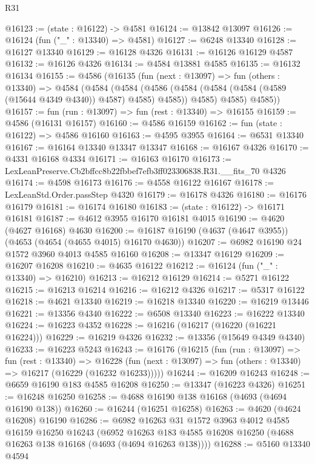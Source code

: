 \begin{lexlean}{R31}
\begin{coremodule}
@16123 := (state : @16122) -> @4581
@16124 := @13842 @13097
@16126 := @16124 (fun ("_" : @13340) => @4581)
@16127 := @6248 @13340
@16128 := @16127 @13340
@16129 := @16128 @4326
@16131 := @16126 @16129 @4587
@16132 := @16126 @4326
@16134 := @4584 @13881 @4585
@16135 := @16132 @16134
@16155 := @4586
    (@16135
      (fun (next : @13097) =>
      fun (others : @13340) =>
      @4584
        (@4584
          (@4584
            (@4586 (@4584 (@4584 (@4584 (@4589 (@15644 @4349 @4340)) @4587) @4585) @4585))
            @4585)
          @4585)
        @4585))
@16157 := fun (run : @13097) => fun (rest : @13340) => @16155
@16159 := @4586 (@16131 @16157)
@16160 := @4586 @16159
@16162 := fun (state : @16122) => @4586 @16160
@16163 := @4595 @3955
@16164 := @6531 @13340
@16167 := @16164 @13340 @13347 @13347
@16168 := @16167 @4326
@16170 := @4331 @16168 @4334
@16171 := @16163 @16170
@16173 := LexLeanPreserve.Cb2bffcc8b22fbbef7efb3ff023306838.R31.__fits_70 @4326
@16174 := @4598 @16173
@16176 := @4558 @16122 @16167
@16178 := LexLeanStd.Order.passStep @4320
@16179 := @16178 @4326
@16180 := @16176 @16179
@16181 := @16174 @16180
@16183 := (state : @16122) -> @16171 @16181
@16187 := @4612 @3955 @16170 @16181 @4015
@16190 := @4620 (@4627 @16168) @4630
@16200 := @16187 @16190 (@4637 (@4647 @3955)) (@4653 (@4654 (@4655 @4015) @16170 @4630))
@16207 := @6982 @16190 @24 @1572 @3960 @4013 @4585 @16160
@16208 := @13347 @16129
@16209 := @16207 @16208
@16210 := @4635 @16122
@16212 := @16124 (fun ("_" : @13340) => @16210)
@16213 := @16212 @16129
@16214 := @5271 @16122
@16215 := @16213 @16214
@16216 := @16212 @4326
@16217 := @5317 @16122
@16218 := @4621 @13340
@16219 := @16218 @13340
@16220 := @16219 @13446
@16221 := @13356 @4340
@16222 := @6508 @13340
@16223 := @16222 @13340
@16224 := @16223 @4352
@16228 := @16216 (@16217 (@16220 (@16221 @16224)))
@16229 := @16219 @4326
@16232 := @13356 (@15649 @4349 @4340)
@16233 := @16223 @5243
@16243 := @16176
    (@16215
      (fun (run : @13097) =>
      fun (rest : @13340) =>
      @16228 (fun (next : @13097) => fun (others : @13340) => @16217 (@16229 (@16232 @16233)))))
@16244 := @16209 @16243
@16248 := @6659 @16190 @183 @4585 @16208
@16250 := @13347 (@16223 @4326)
@16251 := @16248 @16250
@16258 := @4688 @16190 @138 @16168 (@4693 (@4694 @16190 @138))
@16260 := @16244 (@16251 @16258)
@16263 := @4620 (@4624 @16208) @16190
@16286 := @6982
    @16263
    @31
    @1572
    @3963
    @4012
    @4585
    @16159
    @16250
    @16243
    (@6952 @16263 @183 @4585 @16208 @16250 (@4688 @16263 @138 @16168 (@4693 (@4694 @16263 @138))))
@16288 := @5160 @13340 @4594

\end{coremodule}
\end{lexlean}
